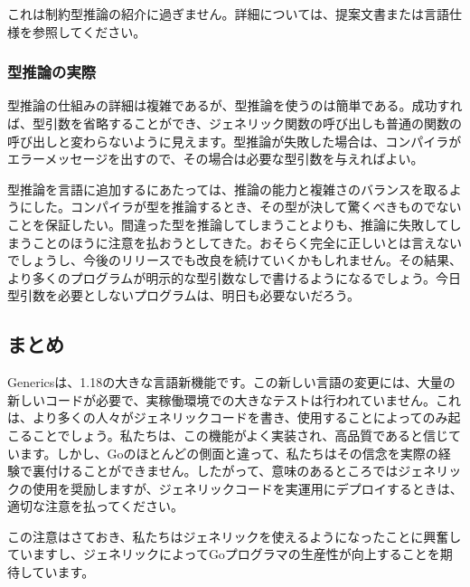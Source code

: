 これは制約型推論の紹介に過ぎません。詳細については、提案文書または言語仕様を参照してください。

\subsubsection{型推論の実際}

型推論の仕組みの詳細は複雑であるが、型推論を使うのは簡単である。成功すれば、型引数を省略することができ、ジェネリック関数の呼び出しも普通の関数の呼び出しと変わらないように見えます。型推論が失敗した場合は、コンパイラがエラーメッセージを出すので、その場合は必要な型引数を与えればよい。

型推論を言語に追加するにあたっては、推論の能力と複雑さのバランスを取るようにした。コンパイラが型を推論するとき、その型が決して驚くべきものでないことを保証したい。間違った型を推論してしまうことよりも、推論に失敗してしまうことのほうに注意を払おうとしてきた。おそらく完全に正しいとは言えないでしょうし、今後のリリースでも改良を続けていくかもしれません。その結果、より多くのプログラムが明示的な型引数なしで書けるようになるでしょう。今日型引数を必要としないプログラムは、明日も必要ないだろう。

\subsection{まとめ}

Genericsは、1.18の大きな言語新機能です。この新しい言語の変更には、大量の新しいコードが必要で、実稼働環境での大きなテストは行われていません。これは、より多くの人々がジェネリックコードを書き、使用することによってのみ起こることでしょう。私たちは、この機能がよく実装され、高品質であると信じています。しかし、Goのほとんどの側面と違って、私たちはその信念を実際の経験で裏付けることができません。したがって、意味のあるところではジェネリックの使用を奨励しますが、ジェネリックコードを実運用にデプロイするときは、適切な注意を払ってください。

この注意はさておき、私たちはジェネリックを使えるようになったことに興奮していますし、ジェネリックによってGoプログラマの生産性が向上することを期待しています。
